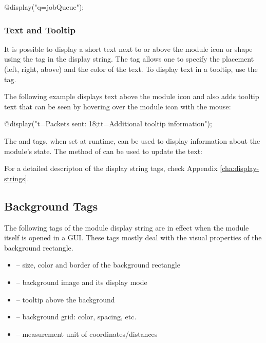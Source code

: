 \begin{ned}
@display("q=jobQueue");
\end{ned}

\begin{center}
\end{center}

\subsubsection{Text and Tooltip}
\label{sec:graphics:submdule-text-and-tooltip}

It is possible to display a short text next to or above the module icon or shape
using the  tag in the display string. The tag allows one to specify the
placement (left, right, above) and the color of the text. To display text in a
tooltip, use the  tag.

The following example displays text above the module icon and also adds tooltip
text that can be seen by hovering over the module icon with the mouse:

\begin{ned}
@display("t=Packets sent: 18;tt=Additional tooltip information");
\end{ned}

\begin{center}
\end{center}

\begin{note}
  The  and  tags, when set at runtime, can be used to display
  information about the module's state. The  method
  of  can be used to update the text:
\end{note}

For a detailed descripton of the display string tags, check
Appendix \ref{cha:display-strings}.


\subsection{Background Tags}
\label{sec:graphics:background-displaystring-tags}

The following tags of the module display string are in effect when the
module itself is opened in a GUI. These tags mostly deal with the visual
properties of the background rectangle.

\begin{itemize}
  \item {} -- size, color and border of the background rectangle
  \item {} -- background image and its display mode
  \item {} -- tooltip above the background
  \item {} -- background grid: color, spacing, etc.
  \item {} -- measurement unit of coordinates/distances
\end{itemize}

